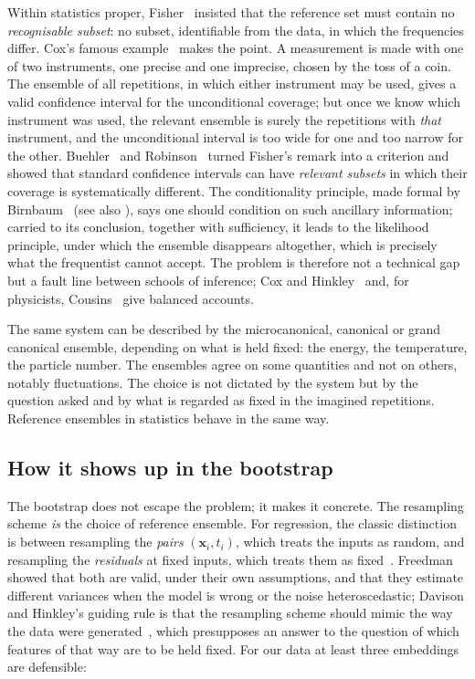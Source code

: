 \documentclass[11pt]{article}
\newcommand{\bx}{\boldsymbol{x}}
\begin{document}
Within statistics proper, Fisher~\cite{fisher1956} insisted that the reference set must
contain no \emph{recognisable subset}: no subset, identifiable from the data, in which the
frequencies differ. Cox's famous example~\cite{cox1958} makes the point. A measurement is
made with one of two instruments, one precise and one imprecise, chosen by the toss of a
coin. The ensemble of all repetitions, in which either instrument may be used, gives a
valid confidence interval for the unconditional coverage; but once we know which
instrument was used, the relevant ensemble is surely the repetitions with \emph{that}
instrument, and the unconditional interval is too wide for one and too narrow for the
other. Buehler~\cite{buehler1959} and Robinson~\cite{robinson1975} turned Fisher's remark
into a criterion and showed that standard confidence intervals can have
\emph{relevant subsets} in which their coverage is systematically different. The
conditionality principle, made formal by Birnbaum~\cite{birnbaum1962} (see also
\cite{berger1988}), says one should condition on such ancillary information; carried to
its conclusion, together with sufficiency, it leads to the likelihood principle, under
which the ensemble disappears altogether, which is precisely what the frequentist cannot
accept. The problem is therefore not a technical gap but a fault line between schools of
inference; Cox and Hinkley~\cite{coxhinkley1974} and, for physicists,
Cousins~\cite{cousins1995} give balanced accounts.

\begin{aside}
The same system can be described by the microcanonical, canonical or grand canonical
ensemble, depending on what is held fixed: the energy, the temperature, the particle
number. The ensembles agree on some quantities and not on others, notably fluctuations.
The choice is not dictated by the system but by the question asked and by what is
regarded as fixed in the imagined repetitions. Reference ensembles in statistics behave in
the same way.
\end{aside}

\subsection{How it shows up in the bootstrap}

The bootstrap does not escape the problem; it makes it concrete. The resampling scheme
\emph{is} the choice of reference ensemble. For regression, the classic distinction is
between resampling the \emph{pairs} $(\bx_i, t_i)$, which treats the inputs as random,
and resampling the \emph{residuals} at fixed inputs, which treats them as
fixed~\cite{freedman1981, wu1986, davison1997}. Freedman showed that both are valid,
under their own assumptions, and that they estimate different variances when the model is
wrong or the noise heteroscedastic; Davison and Hinkley's guiding rule is that the
resampling scheme should mimic the way the data were generated~\cite{davison1997},
which presupposes an answer to the question of which features of that way are to be held
fixed. For our data at least three embeddings are defensible:
\end{document}
